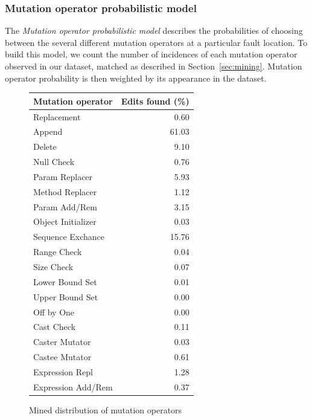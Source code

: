 \documentclass[conference]{IEEEtran}
\begin{document}
\subsubsection{Mutation operator probabilistic model}
The \textit{Mutation operator probabilistic model} 
describes the probabilities of choosing between the several different mutation 
operators at a particular fault location.
%
To build this model,
we count the number of incidences of each mutation operator observed in our
dataset, matched as described in Section~\ref{sec:mining}. Mutation operator probability is then
weighted by its appearance in the dataset.  
%
\begin{figure}[]
\centering
\begin{tabular}{lr}
\toprule
Mutation operator & Edits found (\%) \\
\midrule
Replacement                                            & 0.60  \\
Append                                                 & 61.03 \\
Delete                                                 & 9.10  \\
Null Check											   & 0.76  \\
Param Replacer                                             & 5.93  \\
Method Replacer                                            & 1.12  \\
Param Add/Rem                                          & 3.15  \\
Object Initializer                                               & 0.03  \\
Sequence Exchance                                               & 15.76 \\
Range Check                                            & 0.04  \\
Size Check                                             & 0.07  \\
Lower Bound Set                                            & 0.01  \\
Upper Bound Set                                            & 0.00  \\
Off by One                                             & 0.00  \\
Cast Check                                             & 0.11  \\
Caster Mutator                                             & 0.03  \\
Castee Mutator                                             & 0.61  \\
Expression Repl                                                & 1.28  \\
Expression Add/Rem                                            & 0.37  \\ 
\bottomrule
\end{tabular}
\caption{Mined distribution of mutation operators}
\label{disOfMutOpsTable}
\end{figure}
\end{document}
